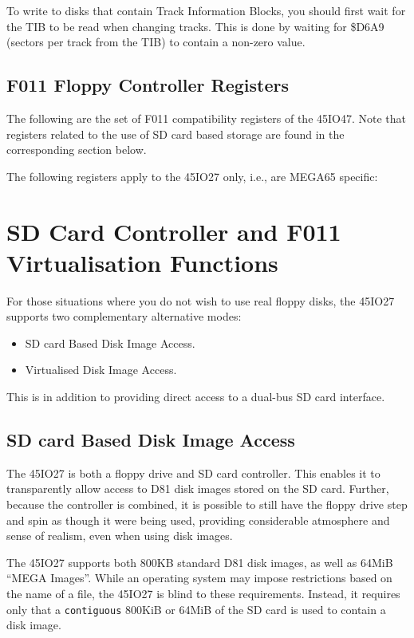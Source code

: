\begin{enumerate}
To write to disks that contain Track Information Blocks,
you should first wait for the TIB to be read when changing tracks. This is done by waiting
for \$D6A9 (sectors per track from the TIB) to contain a non-zero value.

\subsection{F011 Floppy Controller Registers}

The following are the set of F011 compatibility registers of the 45IO47.
Note that registers related to the use of SD card based storage are found in the corresponding section below.



The following registers apply to the 45IO27 only, i.e., are MEGA65 specific:



\section{SD Card Controller and F011 Virtualisation Functions}

For those situations where you do not wish to use real floppy disks,
the 45IO27 supports two complementary alternative modes:

\begin{itemize}
\item SD card Based Disk Image Access.
\item Virtualised Disk Image Access.
\end{itemize}

This is in addition to providing direct access to a dual-bus SD card
interface.

\subsection{SD card Based Disk Image Access}

The 45IO27 is both a floppy drive and SD card controller.
This enables it to transparently allow access to D81 disk images
stored on the SD card.  Further, because the controller is combined,
it is possible to still have the floppy drive step and spin as though
it were being used, providing considerable atmosphere and sense of
realism, even when using disk images.

The 45IO27 supports both 800KB standard D81 disk images, as well as
64MiB ``MEGA Images''.  While an operating system may impose
restrictions based on the name of a file, the 45IO27 is blind to these
requirements. Instead, it requires only that a {\tt contiguous} 800KiB
or 64MiB of the SD card is used to contain a disk image.


\end{enumerate}
